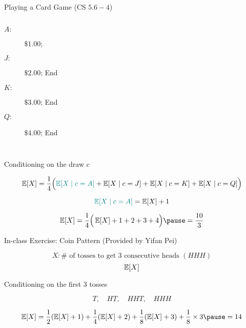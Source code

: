 \begin{frame}{}
  \begin{exampleblock}{\red{($\nexists$)}  Playing a Card Game (CS $5.6-4$)}
    \begin{columns}
        \begin{description}
          \item[$A:$] $\$ 1.00$; 
          \item[$J:$] $\$ 2.00$; End
          \item[$K:$] $\$ 3.00$; End
          \item[$Q:$] $\$ 4.00$; End
        \end{description}
    \end{columns}
  \end{exampleblock}

  \pause
  \begin{center}
    {Conditioning on the  draw $c$}
  \end{center}

  \vspace{-0.20cm}
  \[
    \operatorname*{\mathbb{E}}[X] = \frac{1}{4}\Big(\textcolor{teal}{\operatorname*{\mathbb{E}}[X \mid c = A]} + \operatorname*{\mathbb{E}}[X \mid c = J] + \operatorname*{\mathbb{E}}[X \mid c = K] + \operatorname*{\mathbb{E}}[X \mid c = Q]\Big)
  \]

  \pause
  \vspace{-0.40cm}
  \[
    \textcolor{teal}{\operatorname*{\mathbb{E}}[X \mid c = A]} = \operatorname*{\mathbb{E}}[X] + 1
  \]

  \pause
  \[
    \E[X] = \frac{1}{4}\Big(\E[X] + 1 + 2 + 3 + 4 \Big) \pause = \frac{10}{3}
  \]
\end{frame}

\begin{frame}{}
  \begin{exampleblock}{In-class Exercise: Coin Pattern (Provided by Yifan Pei)}

    \vspace{-0.50cm}
    \[
      X: \# \text{ of tosses to get $3$ consecutive heads } (HHH)
    \]
    \[
      \operatorname*{\mathbb{E}}[X]
    \]
  \end{exampleblock}

  \pause
  \vspace{0.30cm}
  \centerline{Conditioning on the first $3$ tosses}

  \pause
  \vspace{-0.40cm}
  \[
    T, \quad HT, \quad HHT, \quad HHH
  \]

  \pause
  \vspace{-0.40cm}
  \[
    \E[X] = \frac{1}{2} (\E[X] + 1) + \frac{1}{4} (\E[X] + 2) + \frac{1}{8} (\E[X] + 3) + \frac{1}{8} \times 3 \pause = 14
  \]
\end{frame}

